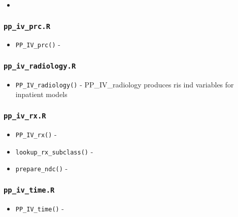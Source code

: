 \documentclass[
]{book}
\providecommand{\tightlist}{%
  \setlength{\itemsep}{0pt}\setlength{\parskip}{0pt}}
\begin{document}
\begin{itemize}
\item
\end{itemize}

\hypertarget{pp_iv_prc.r}{%
\subsubsection{\texorpdfstring{\texttt{pp\_iv\_prc.R}}{pp\_iv\_prc.R}}\label{pp_iv_prc.r}}

\begin{itemize}
\tightlist
\item
  \texttt{PP\_IV\_prc()} -
\end{itemize}

\hypertarget{pp_iv_radiology.r}{%
\subsubsection{\texorpdfstring{\texttt{pp\_iv\_radiology.R}}{pp\_iv\_radiology.R}}\label{pp_iv_radiology.r}}

\begin{itemize}
\tightlist
\item
  \texttt{PP\_IV\_radiology()} - PP\_IV\_radiology produces ris ind variables for inpatient models
\end{itemize}

\hypertarget{pp_iv_rx.r-1}{%
\subsubsection{\texorpdfstring{\texttt{pp\_iv\_rx.R}}{pp\_iv\_rx.R}}\label{pp_iv_rx.r-1}}

\begin{itemize}
\tightlist
\item
  \texttt{PP\_IV\_rx()} -
\item
  \texttt{lookup\_rx\_subclass()} -
\item
  \texttt{prepare\_ndc()} -
\end{itemize}

\hypertarget{pp_iv_time.r}{%
\subsubsection{\texorpdfstring{\texttt{pp\_iv\_time.R}}{pp\_iv\_time.R}}\label{pp_iv_time.r}}

\begin{itemize}
\tightlist
\item
  \texttt{PP\_IV\_time()} -
\end{itemize}
\end{document}
